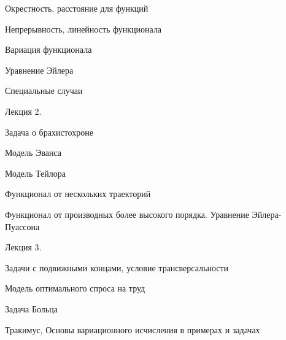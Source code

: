 \documentclass[pdftex,12pt,a4paper]{article}
\begin{document}
Окрестность, расстояние для функций


Непрерывность, линейность функционала


Вариация функционала


Уравнение Эйлера


Специальные случаи



Лекция 2.

Задача о брахистохроне


Модель Эванса


Модель Тейлора



Функционал от нескольких траекторий


Функционал от производных более высокого порядка. Уравнение Эйлера-Пуассона


Лекция 3.


Задачи с подвижными концами, условие трансверсальности

Модель оптимального спроса на труд


Задача Больца







Тракимус, Основы вариационного исчисления в примерах и задачах
\end{document}
